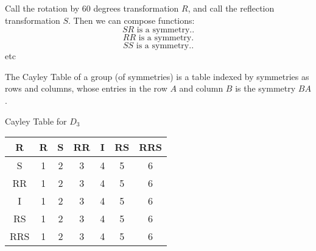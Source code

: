Call the rotation by 60 degrees transformation $R$, and call the reflection transformation $S$. Then we can compose functions:
\[
	SR\text{ is a symmetry.}
.\]
\[
	RR\text{ is a symmetry}
.\]
\[
	SS\text{ is a symmetry}.
.\]
etc

\begin{definition}\label{dfn:2}
	The Cayley Table of a group (of symmetries) is a table indexed by symmetries as rows and columns, whose entries in the row $A$ and column $B$ is the symmetry $BA$.
\end{definition}
\begin{center}
	Cayley Table for $D_3$ \\
\begin{tabular}{c|cccccc}
	R&R&S&RR&I&RS&RRS\\
	\hline
	S&1&2&3&4&5&6\\
	RR&1&2&3&4&5&6\\
	I&1&2&3&4&5&6\\
	RS&1&2&3&4&5&6\\
	RRS&1&2&3&4&5&6
\end{tabular}
	
\end{center}


